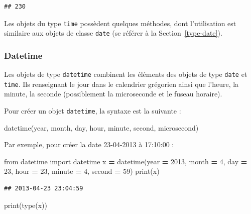 \documentclass[
  12pt,
]{book}
\newenvironment{Shaded}{\begin{snugshade}}{\end{snugshade}}
\newcommand{\BuiltInTok}[1]{#1}
\newcommand{\DecValTok}[1]{\textcolor[rgb]{0.00,0.00,0.81}{#1}}
\newcommand{\ImportTok}[1]{#1}
\newcommand{\NormalTok}[1]{#1}
\newcommand{\OperatorTok}[1]{\textcolor[rgb]{0.81,0.36,0.00}{\textbf{#1}}}
\numberwithin{equation}{section}
\numberwithin{countremarque}{section}
\begin{document}
\begin{lstlisting}
## 230
\end{lstlisting}

Les objets du type \texttt{time} possèdent quelques méthodes, dont l'utilisation est similaire aux objets de classe \texttt{date} (se référer à la Section~\ref{type-date}).

\subsubsection{Datetime}\label{datetime}

Les objets de type \texttt{datetime} combinent les éléments des objets de type \texttt{date} et \texttt{time}. Ils renseignant le jour dans le calendrier grégorien ainsi que l'heure, la minute, la seconde (possiblement la microseconde et le fuseau horaire).

Pour créer un objet \texttt{datetime}, la syntaxe est la suivante :

\begin{Shaded}
\begin{Highlighting}[]
\NormalTok{datetime(year, month, day, hour, minute, second, microsecond)}
\end{Highlighting}
\end{Shaded}

Par exemple, pour créer la date 23-04-2013 à 17:10:00 :

\begin{Shaded}
\begin{Highlighting}[]
\ImportTok{from}\NormalTok{ datetime }\ImportTok{import}\NormalTok{ datetime}
\NormalTok{x }\OperatorTok{=}\NormalTok{ datetime(year }\OperatorTok{=} \DecValTok{2013}\NormalTok{, month }\OperatorTok{=} \DecValTok{4}\NormalTok{, day }\OperatorTok{=} \DecValTok{23}\NormalTok{,}
\NormalTok{  hour }\OperatorTok{=} \DecValTok{23}\NormalTok{, minute }\OperatorTok{=} \DecValTok{4}\NormalTok{, second }\OperatorTok{=} \DecValTok{59}\NormalTok{)}
\BuiltInTok{print}\NormalTok{(x)}
\end{Highlighting}
\end{Shaded}

\begin{lstlisting}
## 2013-04-23 23:04:59
\end{lstlisting}

\begin{Shaded}
\begin{Highlighting}[]
\BuiltInTok{print}\NormalTok{(}\BuiltInTok{type}\NormalTok{(x))}
\end{Highlighting}
\end{Shaded}
\end{document}
